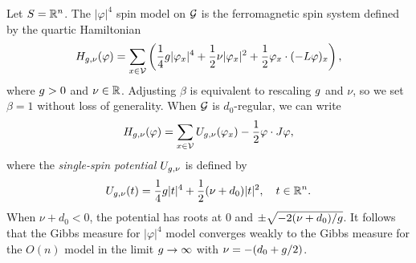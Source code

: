 \begin{example}
Let $S = {\mathbb R}^n$. The $|\varphi|^4$ spin model on $\mathcal{G}$ is the ferromagnetic spin system
defined by the quartic Hamiltonian
\begin{equation}
H_{g,\nu}(\varphi)
  =
\sum_{x\in\mathcal{V}}
\left(
  \frac{1}{4} g |\varphi_x|^4
    +
  \frac{1}{2} \nu |\varphi_x|^2
    +
  \frac{1}{2} \varphi_x \cdot (-L \varphi)_x
\right),
\end{equation}
where $g > 0$ and $\nu\in{\mathbb R}$. Adjusting $\beta$ is equivalent to  rescaling
$g$ and $\nu$, so we set $\beta = 1$ without loss of generality.
When $\mathcal{G}$ is $d_0$-regular, we can write
\begin{equation}
H_{g,\nu}(\varphi)
  =
\sum_{x\in\mathcal{V}} U_{g,\nu}(\varphi_x) - \frac{1}{2} \varphi \cdot J \varphi,
\end{equation}
where the \emph{single-spin potential} $U_{g,\nu}$ is defined by
\begin{equation}
U_{g,\nu}(t)
	=
\frac{1}{4} g |t|^4
	+
\frac{1}{2} (\nu + d_0) |t|^2,
	\quad
t \in {\mathbb R}^n.
\end{equation}
When $\nu + d_0 < 0$, the potential has roots at $0$ and $\pm\sqrt{-2 (\nu + d_0) / g}$.
It follows that the Gibbs measure for $|\varphi|^4$ model converges weakly to the
Gibbs measure for the $O(n)$ model in the limit $g\rightarrow\infty$
with $\nu = -(d_0 + g / 2)$.
\end{example}




